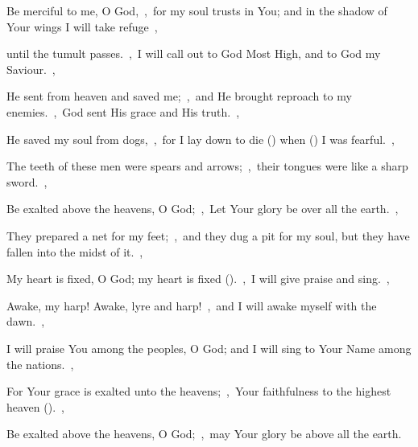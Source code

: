 \documentclass[12pt,twoside,a5paper]{article}
\begin{document}
\begin{normalparskip}
  Be merciful to me, O God,~\sep\ for my soul trusts in You; and in the shadow of Your wings I will take refuge~\sep


  until the tumult passes.~\sep\ I will call out to God Most High, and to God my Saviour.~\sep

  He sent from heaven and saved me;~\sep\ and He brought reproach to my enemies.~\sep\ God sent His grace and His truth.~\sep

  He saved my soul from dogs,~\sep\ for I lay down to die () when () I was fearful.~\sep

  The teeth of these men were spears and arrows;~\sep\ their tongues were like a sharp sword.~\sep

  Be exalted above the heavens, O God;~\sep\ Let Your glory be over all the earth.~\sep

  They prepared a net for my feet;~\sep\ and they dug a pit for my soul, but they have fallen into the midst of it.~\sep

  My heart is fixed, O God; my heart is fixed ().~\sep\ I will give praise and sing.~\sep

  Awake, my harp! Awake, lyre and harp!~\sep\ and I will awake myself with the dawn.~\sep

  I will praise You among the peoples, O God; and I will sing to Your Name among the nations.~\sep

  For Your grace is exalted unto the heavens;~\sep\ Your faithfulness to the highest heaven ().~\sep

  Be exalted above the heavens, O God;~\sep\ may Your glory be above all the earth.
\end{normalparskip}

\end{document}
